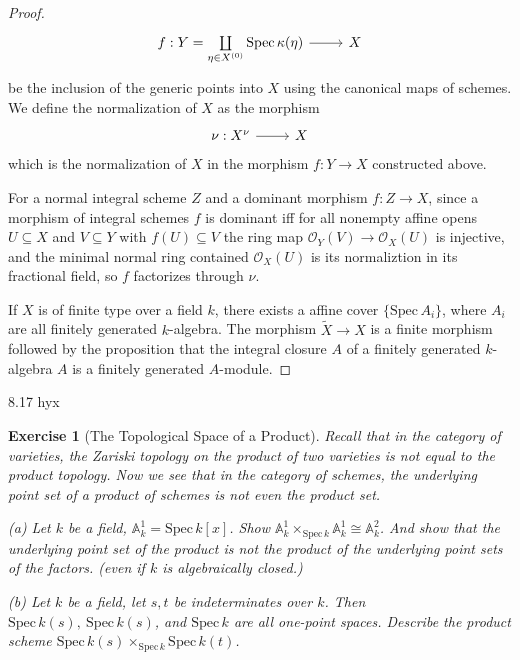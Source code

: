 \documentclass{amsart}
\newtheorem{exe}{Exercise}[subsection]
\begin{document}
\begin{proof}
\begin{equation*}
	\begin{tikzcd}
		f: Y=\coprod\limits_{\eta \in X^{(0)}} \operatorname{Spec}\kappa(\eta) \arrow[r] & X
	\end{tikzcd}
\end{equation*}
be the inclusion of the generic points into $X$ using the canonical maps of schemes.  
We define the normalization of $X$ as the morphism
\begin{equation*}
	\begin{tikzcd}
		\nu: X^{\nu} \arrow[r] & X
	\end{tikzcd}
\end{equation*}
which is the normalization of $X$ in the morphism $f: Y \rightarrow X$ constructed above.

For a normal integral scheme $Z$ and a dominant morphism $f: Z \rightarrow X$,  since a morphism of integral schemes $f$ is dominant  iff for all nonempty affine opens $U \subseteq X$ and $V \subseteq Y$ with $f(U) \subseteq V$ the ring map $\mathcal{O}_{Y}(V) \rightarrow \mathcal{O}_{X}(U)$ is injective,  and the minimal normal ring contained $\mathcal{O}_{X}(U)$ is its normaliztion in its fractional field,  so $f$ factorizes through $\nu$.

If $X$ is of finite type over a field $k$,  there exists a affine cover $\{\mathrm{Spec}\,A_{i}\}$,  where $A_{i}$ are all finitely generated $k$-algebra.  The morphism $\widetilde{X} \rightarrow X$ is a finite morphism followed by the proposition that the integral closure $A$ of a finitely generated $k$-algebra $A$ is a finitely generated $A$-module.
\end{proof}
8.17 hyx

\begin{exe}[The Topological Space of a Product]
	Recall that in the category of varieties, the Zariski topology on the product of two varieties is not equal to the product topology. Now we see that in the category of schemes, the underlying point set of a product of schemes is not even the product set.
	
	(a) Let $k$ be a field, $\mathbb{A}_k^1=\mathrm{Spec}\, k[x]$. Show $\mathbb{A}_k^1 \times_{\mathrm{Spec}\, k} \mathbb{A}_k^1\cong \mathbb{A}_k^2$. And show that the underlying
	point set of the product is not the product of the underlying point sets of the factors. (even if $k$ is algebraically closed.)
	
	(b) Let $k$ be a field, let $s,t$ be indeterminates over $k$. Then $\mathrm{Spec}\,k(s),\ \mathrm{Spec}\,k(s)$, and $\mathrm{Spec}\,k$ are all one-point spaces. Describe the product scheme $\mathrm{Spec}\, k(s)\times_{\mathrm{Spec}\, k}\mathrm{Spec}\, k(t)$.
\end{exe}
\end{document}
